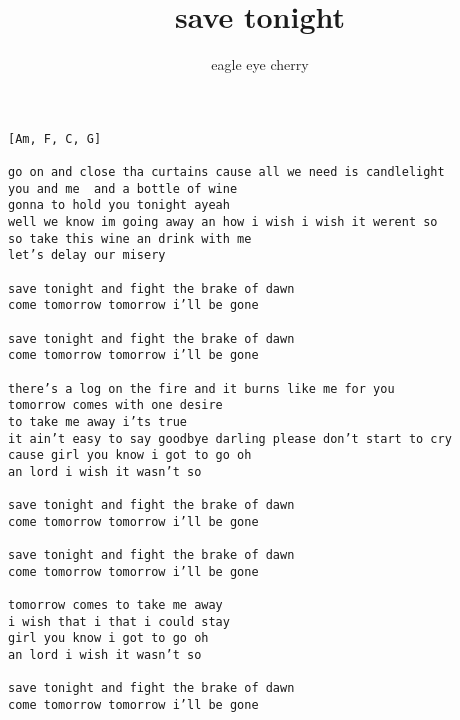 \author{eagle eye cherry}
\title{save tonight}
\maketitle
\begin{verbatim}
[Am, F, C, G]

go on and close tha curtains cause all we need is candlelight
you and me  and a bottle of wine
gonna to hold you tonight ayeah
well we know im going away an how i wish i wish it werent so
so take this wine an drink with me
let’s delay our misery
     
save tonight and fight the brake of dawn
come tomorrow tomorrow i’ll be gone

save tonight and fight the brake of dawn
come tomorrow tomorrow i’ll be gone

there’s a log on the fire and it burns like me for you
tomorrow comes with one desire
to take me away i’ts true
it ain’t easy to say goodbye darling please don’t start to cry
cause girl you know i got to go oh
an lord i wish it wasn’t so
    
save tonight and fight the brake of dawn
come tomorrow tomorrow i’ll be gone

save tonight and fight the brake of dawn
come tomorrow tomorrow i’ll be gone

tomorrow comes to take me away
i wish that i that i could stay
girl you know i got to go oh
an lord i wish it wasn’t so
  
save tonight and fight the brake of dawn
come tomorrow tomorrow i’ll be gone
\end{verbatim}